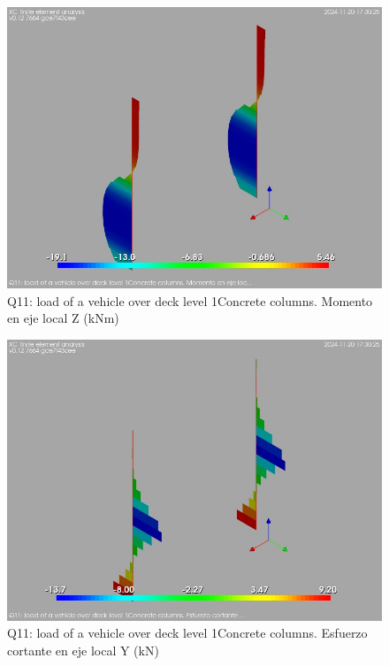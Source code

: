 \begin{figure}[ht]
\begin{center}
\includegraphics[width=\linewidth]{results/graphics/resSimplLC/QvehicleDeck1columnZconcrMz.png}
\caption{Q11: load of a vehicle over deck level 1Concrete columns. Momento en eje local Z (kNm)}
\label{QvehicleDeck1columnZconcrMz}
\end{center}
\end{figure}
\begin{figure}[ht]
\begin{center}
\includegraphics[width=\linewidth]{results/graphics/resSimplLC/QvehicleDeck1columnZconcrVy.png}
\caption{Q11: load of a vehicle over deck level 1Concrete columns. Esfuerzo cortante en eje local Y (kN)}
\label{QvehicleDeck1columnZconcrVy}
\end{center}
\end{figure}
